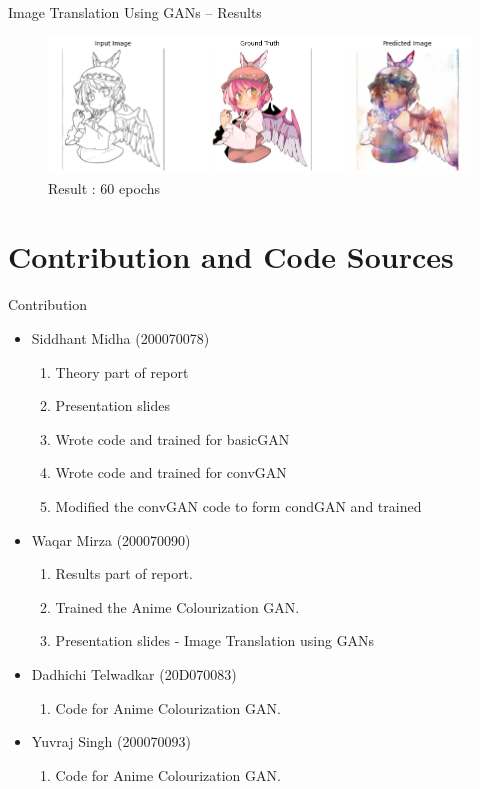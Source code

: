 \documentclass[handout]{beamer}
\begin{document}
\begin{frame}{Image Translation Using GANs -- Results}
     \begin{figure}[h]
        \centering
        \includegraphics[scale = 0.35]{60ep.png}
        \caption{Result : 60 epochs}
    \end{figure}
\end{frame}

\section{Contribution and Code Sources}
\begin{frame}{Contribution}
    \begin{itemize}
        \item Siddhant Midha (200070078) 
        \begin{enumerate}
            \item Theory part of report
            \item Presentation slides
            \item Wrote code and trained for basicGAN
            \item Wrote code and trained for convGAN
            \item Modified the convGAN code to form condGAN and trained
        \end{enumerate}
         \item Waqar Mirza (200070090)
        \begin{enumerate}
            \item Results part of report.
            \item Trained the Anime Colourization GAN.
            \item Presentation slides - Image Translation using GANs
        \end{enumerate}
         \item Dadhichi Telwadkar (20D070083)
        \begin{enumerate}
            \item Code for Anime Colourization GAN.
        \end{enumerate}
         \item Yuvraj Singh (200070093)
        \begin{enumerate}
            \item Code for Anime Colourization GAN.
        \end{enumerate}
        
        
    \end{itemize}
\end{frame}
\end{document}
